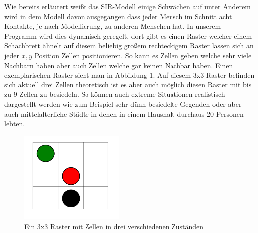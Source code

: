Wie bereits erläutert weißt das SIR-Modell einige Schwächen auf unter Anderem wird in dem Modell davon ausgegangen dass jeder Mensch im Schnitt acht Kontakte, je nach Modellierung, zu anderen Menschen hat. In unserem Programm wird dies dynamisch geregelt, dort gibt es einen Raster welcher einem Schachbrett ähnelt auf diesem beliebig großem rechteckigem \glqq{}Raster\grqq{} lassen sich an jeder $ x,y $ Position Zellen positionieren. So kann es Zellen geben welche sehr viele Nachbarn haben aber auch Zellen welche gar keinen Nachbar haben. Einen exemplarischen Raster sieht man in  Abbildung \ref{fig:Raster}. Auf diesem 3x3 Raster befinden sich aktuell drei Zellen theoretisch ist es aber auch möglich diesen Raster mit bis zu 9 Zellen zu besiedeln. So können auch extreme Situationen realistisch dargestellt werden wie zum Beispiel sehr dünn besiedelte Gegenden oder aber auch mittelalterliche Städte in denen in einem Haushalt durchaus 20 Personen lebten.\\


\begin{figure}[t]
\centering
\includegraphics[width= 0.45\textwidth]{./images/nachbarn.png}
\caption{Ein 3x3 Raster mit Zellen in drei verschiedenen Zuständen}
\label{fig:Raster}
\end{figure}


